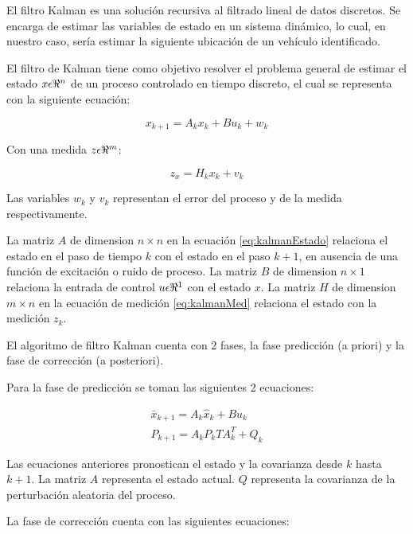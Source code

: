 El filtro Kalman es una solución recursiva al filtrado lineal de datos discretos. Se encarga de estimar las variables de estado en un sistema dinámico, lo cual, en nuestro caso, sería estimar la siguiente ubicación de un vehículo identificado.

El filtro de Kalman tiene como objetivo resolver el problema general de estimar el estado $x \space \epsilon \space \Re^{n}$ de un proceso controlado en tiempo discreto, el cual se representa con la siguiente ecuación:

\begin{equation}
\label{eq:kalmanEstado}
    x_{k+1} = A_kx_k + Bu_k + w_k
\end{equation}

Con una medida $z \space \epsilon \space \Re^{m}$:

\begin{equation}
\label{eq:kalmanMed}
    z_x = H_kx_k + v_k
\end{equation}

Las variables $w_k$ y $v_k$ representan el error del proceso y de la medida respectivamente.

La matriz $A$  de dimension $n\times{}n$ en la ecuación \eqref{eq:kalmanEstado} relaciona el estado en el paso de tiempo $k$ con el estado en el paso $k + 1$, en ausencia de una función de excitación o ruido de proceso. La matriz $B$ de dimension $n\times{}1$ relaciona la entrada de control $u \space \epsilon \Re^{1}$ con el estado $x$. La matriz $H$ de dimension $m\times{}n$ en la ecuación de medición \eqref{eq:kalmanMed} relaciona el estado con la medición $z_k$.

El algoritmo de filtro Kalman cuenta con 2 fases, la fase predicción (a priori) y la fase de corrección (a posteriori).

Para la fase de predicción se toman las siguientes 2 ecuaciones:

\begin{eqnarray}
    \label{eq:kalmanActUno}
    \bar{x}_{k+1} = A_k\hat{x}_k + Bu_k\\
    \label{eq:kalmanActDos}
    P_{k+1} = A_kP_kTA^{T}_k + Q_k
\end{eqnarray}


Las ecuaciones anteriores pronostican el estado y la covarianza desde $k$ hasta $k+1$. La matriz $A$ representa el estado actual. $Q$ representa la covarianza de la perturbación aleatoria del proceso.

La fase de corrección cuenta con las siguientes ecuaciones:


